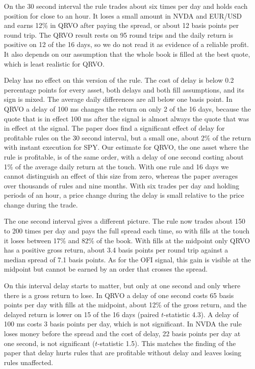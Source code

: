\documentclass{article}
\begin{document}
On the 30 second interval the rule trades about six times per day and holds each position for close to an hour. It loses a small amount in NVDA and EUR/USD and earns 12\% in QRVO after paying the spread, or about 12 basis points per round trip. The QRVO result rests on 95 round trips and the daily return is positive on 12 of the 16 days, so we do not read it as evidence of a reliable profit. It also depends on our assumption that the whole book is filled at the best quote, which is least realistic for QRVO.
 
Delay has no effect on this version of the rule. The cost of delay is below 0.2 percentage points for every asset, both delays and both fill assumptions, and its sign is mixed. The average daily differences are all below one basis point. In QRVO a delay of 100 ms changes the return on only 2 of the 16 days, because the quote that is in effect 100 ms after the signal is almost always the quote that was in effect at the signal. The paper does find a significant effect of delay for profitable rules on the 30 second interval, but a small one, about 2\% of the return with instant execution for SPY. Our estimate for QRVO, the one asset where the rule is profitable, is of the same order, with a delay of one second costing about 1\% of the average daily return at the touch. With one rule and 16 days we cannot distinguish an effect of this size from zero, whereas the paper averages over thousands of rules and nine months. With six trades per day and holding periods of an hour, a price change during the delay is small relative to the price change during the trade.
 
The one second interval gives a different picture. The rule now trades about 150 to 200 times per day and pays the full spread each time, so with fills at the touch it loses between 17\% and 82\% of the book. With fills at the midpoint only QRVO has a positive gross return, about 3.4 basis points per round trip against a median spread of 7.1 basis points. As for the OFI signal, this gain is visible at the midpoint but cannot be earned by an order that crosses the spread.
 
On this interval delay starts to matter, but only at one second and only where there is a gross return to lose. In QRVO a delay of one second costs 65 basis points per day with fills at the midpoint, about 12\% of the gross return, and the delayed return is lower on 15 of the 16 days (paired $t$-statistic 4.3). A delay of 100 ms costs 3 basis points per day, which is not significant. In NVDA the rule loses money before the spread and the cost of delay, 22 basis points per day at one second, is not significant ($t$-statistic 1.5). This matches the finding of the paper that delay hurts rules that are profitable without delay and leaves losing rules unaffected.
 
\end{document}
